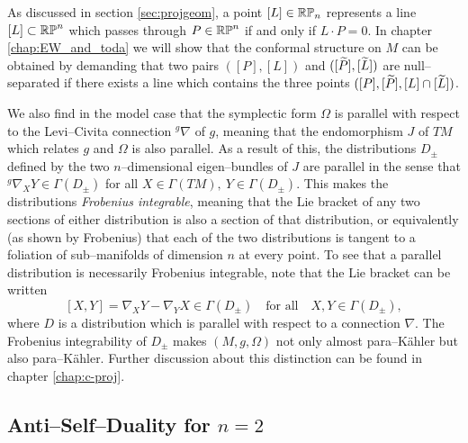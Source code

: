 As discussed in section \ref{sec:projgeom}, a point $[L]\in\mathbb{RP}_n$ represents a line $[L]\subset\mathbb{RP}^n$ which passes through $P\in\mathbb{RP}^n$ if and only if $L\cdot P=0$. In chapter \ref{chap:EW_and_toda} we will show that the conformal structure on $M$ can be obtained by demanding that two pairs $([P], [L])$ and $([\widetilde{P}], [\widetilde{L}])$ are null--separated if there exists a line which contains the three points $([P], [\widetilde{P}], [L]\cap [\widetilde{L}])$. 

We also find in the model case that the symplectic form $\Omega$ is parallel with respect to the Levi--Civita connection $^g\nabla$ of $g$, meaning that the endomorphism $J$ of $TM$ which relates $g$ and $\Omega$ is also parallel.  As a result of this, the distributions $D_\pm$ defined by the two $n$--dimensional eigen--bundles of $J$ are parallel in the sense that $^g\nabla_XY\in\Gamma(D_\pm)$ for all $X\in \Gamma(TM),\ Y\in\Gamma(D_\pm)$. This makes the distributions \textit{Frobenius integrable}, meaning that the Lie bracket of any two sections of either distribution is also a section of that distribution, or equivalently (as shown by Frobenius) that each of the two distributions is tangent to a foliation of sub--manifolds of dimension $n$ at every point. To see that a parallel distribution is necessarily Frobenius integrable, note that the Lie bracket can be written
\[
[X,Y]= \nabla_XY- \nabla_YX\in\Gamma(D_\pm)\quad\mbox{for all}\quad X,Y\in\Gamma(D_\pm),
\]
where $D$ is a distribution which is parallel with respect to a connection $\nabla$. The Frobenius integrability of $D_\pm$ makes $(M,g,\Omega)$ not only almost para--K\"ahler but also para--K\"ahler. Further discussion about this distinction can be found in chapter \ref{chap:c-proj}.



\subsection{Anti--Self--Duality for $n=2$}

